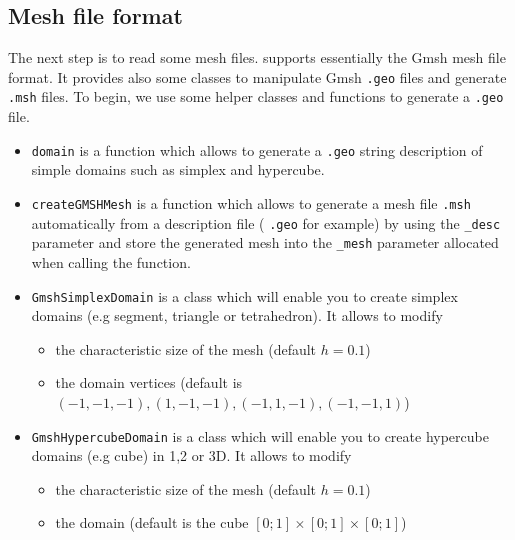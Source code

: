 
%

\subsection{Mesh file format}
The next step is to read some mesh files. \feel supports essentially the Gmsh mesh file format. It provides also some classes to manipulate Gmsh \lstinline!.geo! files and generate \lstinline!.msh! files. To begin, we use some helper classes and functions to generate a \lstinline!.geo! file.

\begin{itemize}
\item \lstinline!domain! is a function which allows to generate a \verb|.geo| string description of simple domains such as simplex and hypercube.

\item \lstinline!createGMSHMesh! is a function which allows to generate a mesh file \verb|.msh| automatically from a description file ( \verb|.geo| for example) by using the \verb|_desc| parameter and store the generated mesh into the \verb|_mesh| parameter allocated when calling the function.

\item \lstinline!GmshSimplexDomain! is a class which will enable you to create simplex domains (e.g segment, triangle or tetrahedron). It allows to modify
  	\begin{itemize}
	 \item the characteristic size of the mesh (default $h=0.1$)
  	\item the domain vertices (default is $(-1,-1,-1), (1,-1,-1), (-1,1,-1), (-1,-1,1)$)
  	\end{itemize}

\item \lstinline!GmshHypercubeDomain! is a class which will enable you to create hypercube domains (e.g cube) in 1,2 or 3D. It allows to modify
  	\begin{itemize}
  	\item the characteristic size of the mesh (default $h=0.1$)
  	\item the domain (default is the cube $[0;1]\times[0;1]\times[0;1]$)
  	\end{itemize}
\end{itemize}



